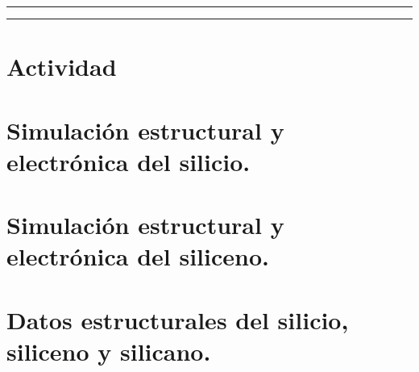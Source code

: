 








\tableofcontents			%

\begin{center}
	\rule[0mm]{150mm}{0.1mm}		%
	\end{center}
	
	
\begin{abstract}		%
  
\end{abstract}
	
\begin{center}
	\rule[0mm]{150mm}{0.1mm}
	\end{center}

\section{Actividad}	
            
                            
\section{Simulación estructural y electrónica del silicio.}	
      
    
\section{Simulación estructural y electrónica del siliceno.}	
         
    
\section{Datos estructurales del silicio, siliceno y silicano.}	
          
    

\nocite{*}


